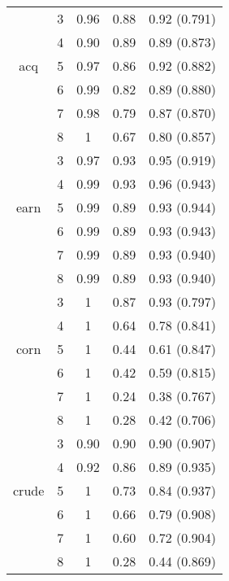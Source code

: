 \begin{table}[]
{\begin{tabular}{| c | c | c | c | c | }
		& 3 & 0.96 & 0.88 & 0.92 (0.791)    \\ 
		& 4 & 0.90 & 0.89 &  0.89 (0.873)   \\
		acq	& 5 & 0.97 & 0.86 & 0.92  (0.882)   \\ 
		& 6 & 0.99 & 0.82 & 0.89  (0.880)   \\
		& 7 & 0.98 & 0.79 & 0.87  (0.870)   \\
		& 8 & 1 & 0.67 & 0.80  (0.857)   \\
		\hline
		
		
		
		& 3 & 0.97 & 0.93 &  0.95 (0.919)   \\ 
		& 4 & 0.99 & 0.93 &  0.96 (0.943)   \\ 
		earn & 5 & 0.99 & 0.89 &  0.93  (0.944)  \\ 
		& 6 & 0.99 & 0.89 &  0.93  (0.943)  \\ 
		& 7 & 0.99 & 0.89 &  0.93  (0.940)  \\ 
		& 8 & 0.99 & 0.89 &  0.93  (0.940)  \\ \hline
		
		
		
		& 3 & 1 & 0.87 & 0.93  (0.797)   \\ 
		& 4 & 1 & 0.64 & 0.78  (0.841)   \\ 
		corn	& 5 & 1 & 0.44 &  0.61 (0.847)   \\ 
		& 6 & 1 & 0.42 & 0.59  (0.815)   \\ 
		& 7 & 1 & 0.24 & 0.38  (0.767)  \\ 
		& 8 & 1 & 0.28& 0.42  (0.706)   \\ \hline
		
		
		& 3 & 0.90 & 0.90 &  0.90  (0.907)  \\ 
		& 4 & 0.92 & 0.86 & 0.89  (0.935)   \\ 
		crude & 5 & 1 & 0.73 &  0.84 (0.937)   \\ 
		& 6 & 1 & 0.66 &  0.79 (0.908)   \\
		& 7 & 1 & 0.60 &  0.72 (0.904)   \\
		& 8 & 1 & 0.28 &  0.44  (0.869)  \\ \hline
		
		
		
\end{tabular}} 

\end{table}
